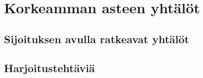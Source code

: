 \chapter{Korkeamman asteen yhtälöt}

\section{Sijoituksen avulla ratkeavat yhtälöt}

\section{Harjoitustehtäviä}
